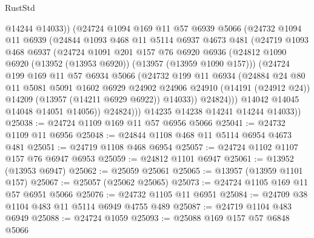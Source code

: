 \begin{lexlean}{RustStd}
\begin{coremodule}
                @14244
                @14033))
            (@24724
              @1094
              @169
              @11
              @57
              @6939
              @5066
              (@24732
                @1094
                @11
                @6939
                (@24844
                  @1093
                  @468
                  @11
                  @5114
                  @6937
                  @4673
                  @481
                  (@24719
                    @1093
                    @468
                    @6937
                    (@24724
                      @1091
                      @201
                      @157
                      @76
                      @6920
                      @6936
                      (@24812 @1090 @6920 (@13952 (@13953 @6920)) (@13957 (@13959 @1090 @157)))
                      (@24724
                        @199
                        @169
                        @11
                        @57
                        @6934
                        @5066
                        (@24732
                          @199
                          @11
                          @6934
                          (@24884
                            @24
                            @80
                            @11
                            @5081
                            @5091
                            @1602
                            @6929
                            @24902
                            @24906
                            @24910
                            (@14191 (@24912 @24))
                            @14209
                            (@13957 (@14211 @6929 @6922))
                            @14033))
                        @24824)))
                  @14042
                  @14045
                  @14048
                  @14051
                  @14056))
              @24824)))
        @14235
        @14238
        @14241
        @14244
        @14033))
@25038 := @24724 @1109 @169 @11 @57 @6956 @5066
@25041 := @24732 @1109 @11 @6956
@25048 := @24844 @1108 @468 @11 @5114 @6954 @4673 @481
@25051 := @24719 @1108 @468 @6954
@25057 := @24724 @1102 @1107 @157 @76 @6947 @6953
@25059 := @24812 @1101 @6947
@25061 := @13952 (@13953 @6947)
@25062 := @25059 @25061
@25065 := @13957 (@13959 @1101 @157)
@25067 := @25057 (@25062 @25065)
@25073 := @24724 @1105 @169 @11 @57 @6951 @5066
@25076 := @24732 @1105 @11 @6951
@25084 := @24709 @38 @1104 @483 @11 @5114 @6949 @4755 @489
@25087 := @24719 @1104 @483 @6949
@25088 := @24724 @1059
@25093 := @25088 @169 @157 @57 @6848 @5066

\end{coremodule}
\end{lexlean}
